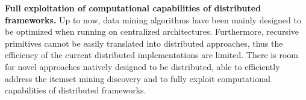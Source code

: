 \textbf{Full exploitation of computational capabilities of distributed
frameworks.}
Up to now, data mining algorithms have been mainly designed to be
optimized when running on centralized architectures.
Furthermore, recursive primitives cannot be easily translated into
distributed approaches,
thus the efficiency of the current distributed
implementations are limited.
There is room for novel approaches natively
designed to be distributed, able to efficiently address the itemset
mining discovery and to fully exploit computational capabilities of
distributed frameworks.


